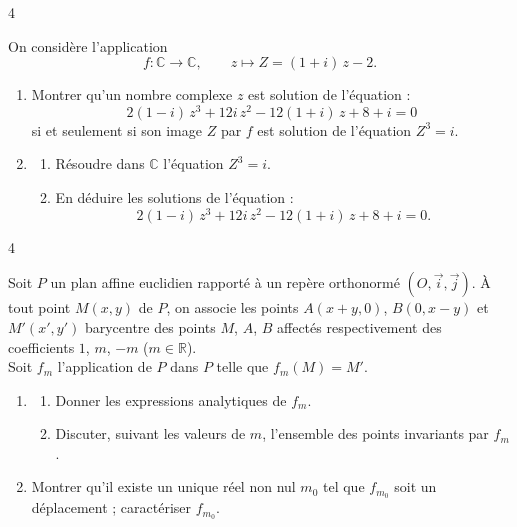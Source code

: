 \documentclass{axiobac}
\begin{document}
\entete

\begin{exercice}{4}

On considère l'application
\[
f : \mathbb{C} \longrightarrow \mathbb{C}, \qquad z \longmapsto Z = (1 + i)\,z - 2 .
\]

\begin{enumerate}
    \item Montrer qu'un nombre complexe $z$ est solution de l'équation :
    \[
    2(1 - i)\,z^3 + 12i\,z^2 - 12(1 + i)\,z + 8 + i = 0
    \]
    si et seulement si son image $Z$ par $f$ est solution de l'équation $Z^3 = i$.
    \item
    \begin{enumerate}
        \item Résoudre dans $\mathbb{C}$ l'équation $Z^3 = i$.
        \item En déduire les solutions de l'équation :
        \[
        2(1 - i)\,z^3 + 12i\,z^2 - 12(1 + i)\,z + 8 + i = 0 .
        \]
    \end{enumerate}
\end{enumerate}

\end{exercice}

\begin{exercice}{4}

Soit $P$ un plan affine euclidien rapporté à un repère orthonormé $(O, \vec{i}, \vec{j})$. À tout point $M(x, y)$ de $P$, on associe les points $A(x + y, 0)$, $B(0, x - y)$ et $M'(x', y')$ barycentre des points $M$, $A$, $B$ affectés respectivement des coefficients $1$, $m$, $-m$ ($m \in \mathbb{R}$). \\
Soit $f_m$ l'application de $P$ dans $P$ telle que $f_m(M) = M'$.

\begin{enumerate}
    \item
    \begin{enumerate}
        \item Donner les expressions analytiques de $f_m$.
        \item Discuter, suivant les valeurs de $m$, l'ensemble des points invariants par $f_m$.
    \end{enumerate}
    \item Montrer qu'il existe un unique réel non nul $m_0$ tel que $f_{m_0}$ soit un déplacement ; caractériser $f_{m_0}$.
\end{enumerate}

\end{exercice}
\end{document}
